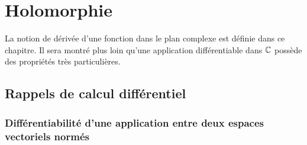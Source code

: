 \chapter{Holomorphie}
La notion de dérivée d'une fonction dans le plan complexe est définie dans ce chapitre. Il sera montré plus loin qu'une application différentiable dans $\mathbb{C}$ possède des propriétés très particulières.
\section{Rappels de calcul différentiel}

\subsection{Différentiabilité d'une application entre deux espaces vectoriels normés}


